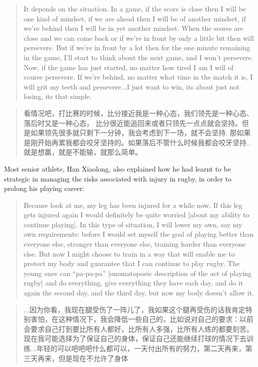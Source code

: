 \begin{CJK}{UTF8}{gbsn}
    \begin{quote}
      It depends on the situation.  In a game, if the score is close then I will be one kind of mindset, if we are ahead then I will be of another mindset, if we're behind then I will be in yet another mindset.  When the scores are close and we can come back or if we're in front by only a little bit then will persevere.  But if we're in front by a lot then for the one minute remaining in the game, I'll start to think about the next game, and I won't persevere.  Now, if the game has just started, no matter how tired I am I will of course persevere. If we're behind, no matter what time in the match it is, I will grit my teeth and persevere...I just want to win, its about just not losing, its that simple.
    \end{quote}

    \begin{quote}
      看情况吧，打比赛的时候，比分接近我是一种心态，我们领先是一种心态、落后时又是一种心态， 比分很近能追回来或者只领先一点点就会坚持。但是如果领先很多就只剩下一分钟，我会考虑到下一场，就不会坚持.  那如果是刚开始再累我都会咬牙坚持的。如果落后不管什么时候我都会咬牙坚持..就是想赢，就是不能输，就那么简单。
    \end{quote}

Most senior athlete, Han Xiaolong, also explained how he had learnt to be strategic in managing the risks associated with injury in rugby, in order to prolong his playing career:

    \begin{quote}
      Because look at me, my leg has been injured for a while now.  If this leg gets injured again I would definitely be quite worried [about my ability to continue playing]. In this type of situation, I will lower my own, say my own requirements: before I would set myself the goal of playing better than everyone else, stronger than everyone else, training harder than everyone else.  But now I might choose to train in a way that will enable me to protect my body and guarantee that I can continue to play rugby.  The young ones can ``pa-pa-pa'' [onomatopoeic description of the act of playing rugby] and do everything, give everything they have each day, and do it again the second day, and the third day, but now my body doesn't allow it.
    \end{quote}

\begin{quote}
      ...因为你看，我现在腿受伤了一阵儿了，我如果这个腿再受伤的话我肯定特别害怕，在这种情况下，我会降低一些自己的，比如说对自己的要求：以前会要求自己打到要比所有人都好，比所有人多强，比所有人练的都要刻苦。现在我可能选择为了保证自己的身体，保证自己还能继续打球的情况下去训练...年轻的可以吧吧吧什么都可以，一天付出所有的努力，第二天再来，第三天再来，但是现在不允许了身体
\end{quote}


\end{CJK}
